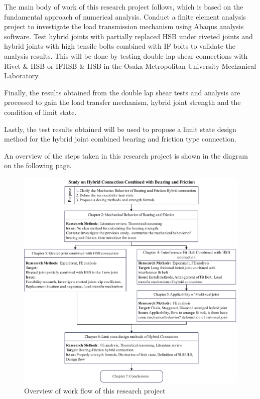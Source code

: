The main body of work of this research project follows, which is based on the fundamental approach of numerical analysis. Conduct a finite element analysis project to investigate the load transmission mechanism using Abaqus analysis software. Test hybrid joints with partially replaced HSB under riveted joints and hybrid joints with high tensile bolts combined with IF bolts to validate the analysis results. This will be done by testing double lap shear connections with Rivet \& \ac{HSB} or \ac{IFHSB} \& HSB in the Osaka Metropolitan University Mechanical Laboratory.

Finally, the results obtained from the double lap shear tests and analysis are processed to gain the load transfer mechanism, hybrid joint strength and the condition of limit state.

Lastly, the test results obtained will be used to propose a limit state design method for the hybrid joint combined bearing and friction type connection.

An overview of the steps taken in this research project is shown in the diagram on the following page.

\begin{figure}
    \centering
    \includegraphics[width=\textwidth]{imgs/intro/research-flow.pdf}
    \caption{Overview of work flow of this research project}
    \label{fig-rflow}
\end{figure}